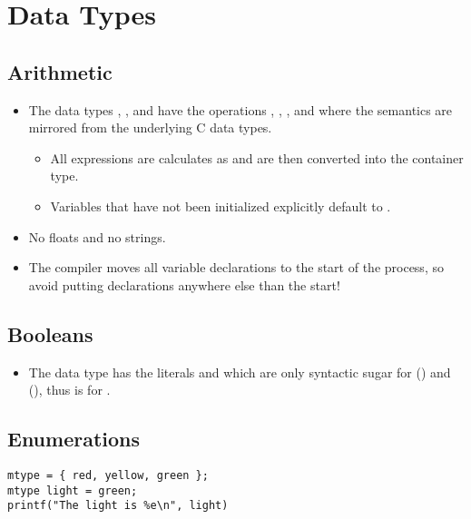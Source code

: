 \section{Data Types}
	\subsection{Arithmetic}
		\begin{itemize}
			\item The data types , ,  and  have the operations \inlinePromela{+}, \inlinePromela{-}, \inlinePromela{*}, \inlinePromela{/} and \inlinePromela{\%} where the semantics are mirrored from the underlying C data types.
				\begin{itemize}
					\item All expressions are calculates as  and are then converted into the container type.
					\item Variables that have not been initialized explicitly default to .
				\end{itemize}
			\item No floats and no strings.
			\item The compiler moves all variable declarations to the start of the process, so avoid putting declarations anywhere else than the start!
		\end{itemize}

	\subsection{Booleans}
		\begin{itemize}
			\item The data type  has the literals  and  which are only syntactic sugar for  () and  (), thus is  for .
		\end{itemize}

	\subsection{Enumerations}
		\begin{lstlisting}[caption = { PROMELA Enumerations }, label = lst:promelaEnum, language = PROMELA]
mtype = { red, yellow, green };
mtype light = green;
printf("The light is %e\n", light)
			\end{lstlisting}

